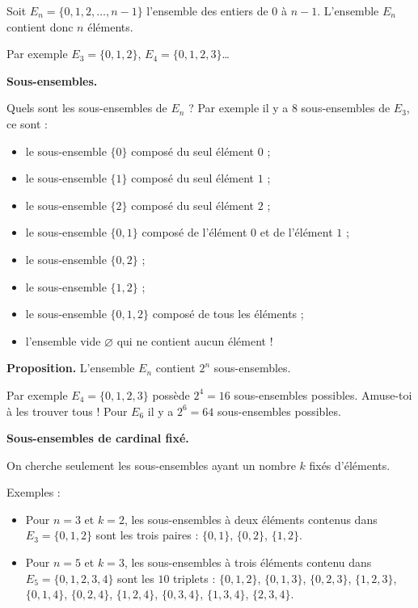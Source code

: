 \documentclass[11pt,class=report,crop=false]{standalone}
\begin{document}
\begin{cours}

Soit $E_n = \{0,1,2,\ldots,n-1\}$ l'ensemble des entiers de $0$ à $n-1$. L'ensemble $E_n$ contient donc $n$ éléments.

Par exemple $E_3 = \{ 0,1,2 \}$, $E_4 = \{ 0,1,2,3 \}$\ldots

\bigskip

\textbf{Sous-ensembles.}

Quels sont les sous-ensembles de $E_n$ ? Par exemple il y a $8$ sous-ensembles de $E_3$, ce sont :
    \begin{itemize}
      \item le sous-ensemble $\{0\}$ composé du seul élément $0$ ;
      \item le sous-ensemble $\{1\}$ composé du seul élément $1$ ;      
      \item le sous-ensemble $\{2\}$ composé du seul élément $2$ ; 
      \item le sous-ensemble $\{0,1\}$ composé de l'élément $0$ et de l'élément $1$ ;           
      \item le sous-ensemble $\{0,2\}$ ;
      \item le sous-ensemble $\{1,2\}$ ; 
      \item le sous-ensemble $\{0, 1,2\}$ composé de tous les éléments ;
      \item l'ensemble vide $\varnothing$ qui ne contient aucun élément !    
    \end{itemize} 

\medskip

\textbf{Proposition.} L'ensemble $E_n$ contient $2^n$ sous-ensembles.

\medskip

Par exemple $E_4 = \{ 0,1,2,3 \}$ possède $2^4 = 16$ sous-ensembles possibles. Amuse-toi à les trouver tous ! Pour $E_6$ il y a $2^6 = 64$  sous-ensembles possibles.

\bigskip

\textbf{Sous-ensembles de cardinal fixé.}

On cherche seulement les sous-ensembles ayant un nombre $k$ fixés d'éléments.

Exemples :
\begin{itemize}
  \item Pour $n = 3$ et $k = 2$, les sous-ensembles à deux éléments contenus dans $E_3 = \{ 0,1,2 \}$ sont les trois paires : $\{0,1\}$, $\{0,2\}$, $\{1,2\}$.

  \item Pour $n = 5$ et $k = 3$, les sous-ensembles à trois éléments contenu dans $E_5 = \{ 0,1,2,3,4 \}$ sont les $10$ triplets :
  $\{0, 1, 2\}$, $\{0, 1, 3\}$, $\{0, 2, 3\}$, $\{1, 2, 3\}$, $\{0, 1, 4\}$, $\{0, 2, 4\}$, $\{1, 2, 4\}$, $\{0, 3, 4\}$, $\{1, 3, 4\}$, $\{2, 3, 4\}$.
  
\end{itemize}

\end{cours}
\end{document}
